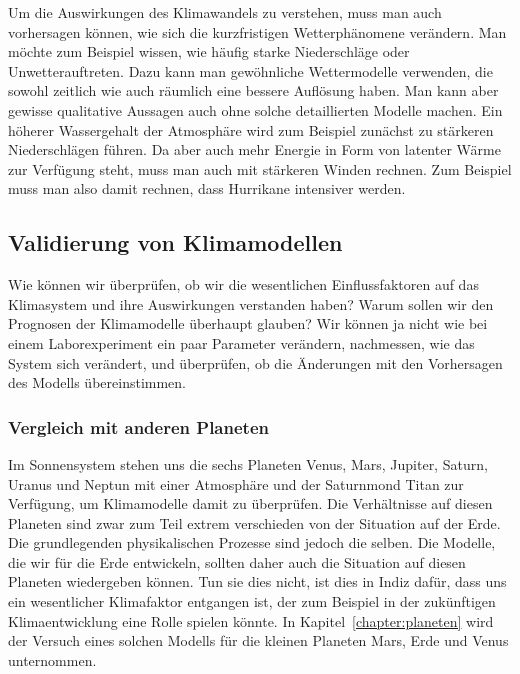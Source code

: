 Um die Auswirkungen des Klimawandels zu verstehen, muss man auch
vorhersagen können, wie sich die kurzfristigen Wetterphänomene
verändern.
Man möchte zum Beispiel wissen, wie häufig starke Niederschläge oder
Unwetterauftreten.
Dazu kann man gewöhnliche Wettermodelle verwenden, die sowohl zeitlich
wie auch räumlich eine bessere Auflösung haben.
Man kann aber gewisse qualitative Aussagen auch ohne solche
detaillierten Modelle machen.
Ein höherer Wassergehalt der Atmosphäre wird zum Beispiel zunächst
zu stärkeren Niederschlägen führen.
Da aber auch mehr Energie in Form von latenter Wärme zur Verfügung
steht, muss man auch mit stärkeren Winden rechnen.
Zum Beispiel muss man also damit rechnen, dass Hurrikane intensiver
werden.

\subsection{Validierung von Klimamodellen}
Wie können wir überprüfen, ob wir die wesentlichen Einflussfaktoren
auf das Klimasystem und ihre Auswirkungen verstanden haben?
Warum sollen wir den Prognosen der Klimamodelle überhaupt glauben?
Wir können ja nicht wie bei einem Laborexperiment ein paar Parameter
verändern, nachmessen, wie das System sich verändert, und überprüfen,
ob die Änderungen mit den Vorhersagen des Modells übereinstimmen.

\subsubsection{Vergleich mit anderen Planeten}
Im Sonnensystem stehen uns die sechs Planeten Venus,
%
%
%
%
%
%
Mars, Jupiter, Saturn, Uranus und Neptun mit einer Atmosphäre und
der Saturnmond Titan zur Verfügung, um Klimamodelle damit zu überprüfen.
%
Die Verhältnisse auf diesen Planeten sind zwar zum Teil extrem verschieden
von der Situation auf der Erde.
Die grundlegenden physikalischen Prozesse sind jedoch die selben.
Die Modelle, die wir für die Erde entwickeln, sollten daher auch
die Situation auf diesen Planeten wiedergeben können.
Tun sie dies nicht, ist dies in Indiz dafür, dass uns ein wesentlicher 
Klimafaktor entgangen ist, der zum Beispiel in der zukünftigen Klimaentwicklung
eine Rolle spielen könnte.
In Kapitel~\ref{chapter:planeten} wird der Versuch eines solchen Modells
für die kleinen Planeten Mars, Erde und Venus unternommen.

